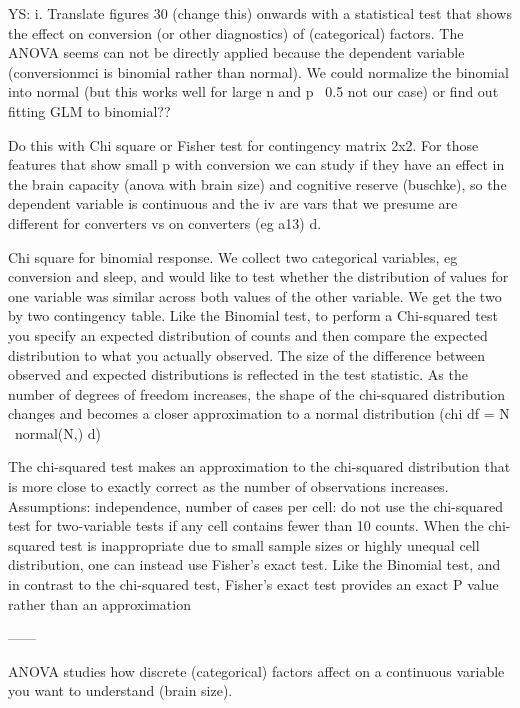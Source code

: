 \documentclass[11pt]{article}
\theoremstyle{definition}
\theoremstyle{remark}
\begin{document}
YS: i. Translate figures 30 (change this) onwards with a statistical test that shows the effect on conversion (or other diagnostics) of (categorical) factors. The ANOVA seems can not be directly applied because the dependent variable (conversionmci is binomial rather than normal). We could normalize the binomial into normal (but this works well for large n and p ~0.5 not our case) or find out fitting GLM to binomial?? 

Do this with Chi square or Fisher test for contingency matrix 2x2. For those features that show small p with conversion we can study if they have an effect in the brain capacity (anova with brain size) and cognitive reserve (buschke), so the dependent variable is continuous and the iv are vars that we presume are different for converters vs on converters (eg a13) d.






Chi square for binomial response.
We collect two categorical variables, eg conversion and sleep, and would like to test whether the distribution of values for one variable was similar across both values of the other variable. We get the two by two contingency table. Like the Binomial test, to perform a Chi-squared test you specify an expected distribution of counts and then compare the expected distribution to what you actually observed. The size of the difference between observed and expected distributions is reflected in the test statistic.
As the number of degrees of freedom increases, the shape of the chi-squared distribution changes and becomes a closer approximation to a normal distribution (chi df = N ~normal(N,) d)

The chi-squared test makes an approximation to the chi-squared distribution that is more close to exactly correct as the number of observations increases. Assumptions: independence, number of cases per cell: do not use the chi-squared test for two-variable tests if any cell contains fewer than 10 counts. When the chi-squared test is inappropriate due to small sample sizes or highly unequal cell distribution, one can instead use Fisher’s exact test.
Like the Binomial test, and in contrast to the chi-squared test, Fisher’s exact test provides an exact P value rather than an approximation

------

ANOVA studies how discrete (categorical) factors affect on a continuous variable you want to understand (brain size).
\end{document}
